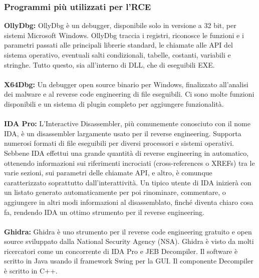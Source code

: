 \documentclass{article}
\begin{document}
\subsubsection{Programmi più utilizzati per l’RCE}
\noindent
\textbf{OllyDbg:} OllyDbg è un debugger, disponibile solo in versione a 32 bit, per sistemi Microsoft Windows. 
OllyDbg traccia i registri, riconosce le funzioni e i parametri passati alle principali librerie standard, 
le chiamate alle API del sistema operativo, eventuali salti condizionali, tabelle, costanti, variabili e 
stringhe. Tutto questo, sia all'interno di DLL, che di eseguibili EXE.\\\\
\textbf{X64Dbg:} Un debugger open source binario per Windows, finalizzato all'analisi dei malware e al 
reverse code engineering di file eseguibili. Ci sono molte funzioni disponibili e un sistema di plugin 
completo per aggiungere funzionalità.\\\\
\textbf{IDA Pro:} L'Interactive Disassembler, più comunemente conosciuto con il nome IDA, è un 
disassembler largamente usato per il reverse engineering. Supporta numerosi formati di file eseguibili 
per diversi processori e sistemi operativi.
Sebbene IDA effettui una grande quantità di reverse engineering in automatico, ottenendo informazioni 
sui riferimenti incrociati (cross-references o XREFs) tra le varie sezioni, sui parametri delle chiamate 
API, e altro, è comunque caratterizzato soprattutto dall'interattività. Un tipico utente di IDA inizierà 
con un listato generato automaticamente per poi rinominare, commentare, o aggiungere in altri modi 
informazioni al disassemblato, finché diventa chiaro cosa fa, rendendo IDA un ottimo strumento per il 
reverse engineering.\\\\
\textbf{Ghidra:} Ghidra è uno strumento per il reverse code engineering gratuito e open source sviluppato 
dalla National Security Agency (NSA). Ghidra è visto da molti ricercatori come un concorrente di IDA Pro 
e JEB Decompiler. Il software è scritto in Java usando il framework Swing per la GUI. Il componente 
Decompiler è scritto in C++. 
\end{document}
